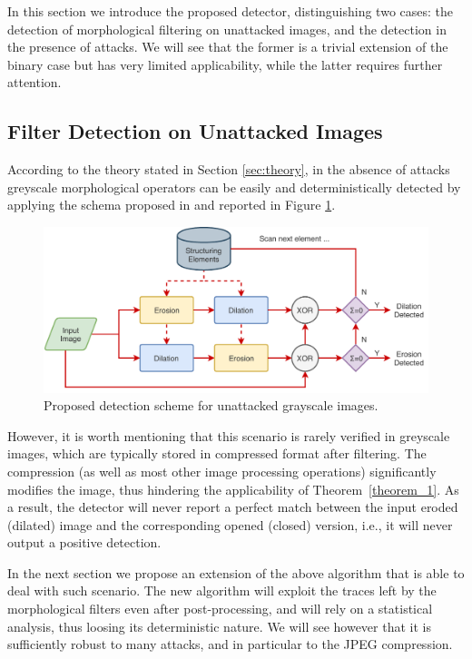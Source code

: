 \documentclass[review]{elsarticle}
\begin{document}
In this section we introduce the proposed detector, distinguishing two cases: the detection of morphological filtering on unattacked images, and the detection in the presence of attacks. We will see that the former is a trivial extension of the binary case but has very limited applicability, while the latter requires further attention.

\subsection{Filter Detection on Unattacked Images}

According to the theory stated in Section \ref{sec:theory}, in the absence of attacks greyscale morphological operators can be easily and deterministically detected by applying the schema proposed in \cite{de2017detecting} and reported in Figure \ref{fig:scheme}.

\begin{figure}[!ht]
	\centering
	\includegraphics[width=\linewidth]{diagram1}
	\caption{Proposed detection scheme for unattacked grayscale images.}
	\label{fig:scheme}
\end{figure}

However, it is worth mentioning that this scenario is rarely verified in greyscale images, which are typically stored in compressed format after filtering. The compression (as well as most other image processing operations) significantly modifies the image, thus hindering the applicability of Theorem~\ref{theorem_1}. As a result, the detector will never report a perfect match between the input eroded (dilated) image and the corresponding opened (closed) version, i.e., it will never output a positive detection.

In the next section we propose an extension of the above algorithm that is able to deal with such scenario. The new algorithm will exploit the traces left by the morphological filters even after post-processing, and will rely on a statistical analysis, thus loosing its deterministic nature. We will see however that it is sufficiently robust to many attacks, and in particular to the JPEG compression.
\end{document}
